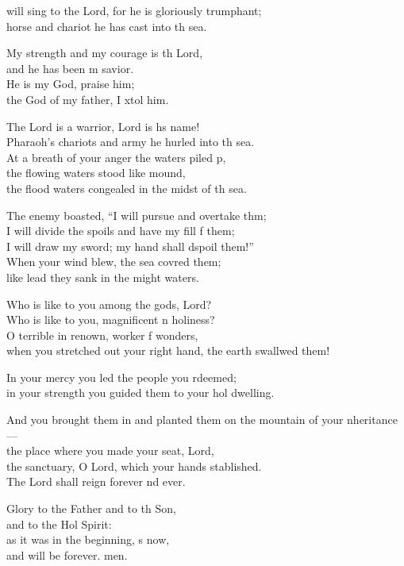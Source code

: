 \settowidth{\versewidth}{And you brought them in and planted them on the mountain of your inheritance— *}
\begin{psalmverse}%
  \begin{patverse}
     will sing to the Lord, for he is gloriously tr\pointup{\i}umphant;\Med\\
horse and chariot he has cast into th sea.

My strength and my courage is th Lord,\Med\\
and he has been m savior.\\
He is my God,  praise him;\Med\\
the God of my father, I xtol him.

The Lord is a warrior, Lord is h\pointup{\i}s name!\Med\\
Pharaoh’s chariots and army he hurled into th sea.\\
At a breath of your anger the waters piled p,\Flex\\
the flowing waters stood like  mound,\Med\\
the flood waters congealed in the midst of th sea.

The enemy boasted, “I will pursue and overtake thm;\Flex\\
I will divide the spoils and have my fill f them;\Med\\
I will draw my sword; my hand shall dspoil them!”\\
When your wind blew, the sea covred them;\Med\\
like lead they sank in the might waters.

Who is like to you among the gods,  Lord?\Med\\
Who is like to you, magnificent \pointup{\i}n holiness?\\
O terrible in renown, worker f wonders,\Med\\
when you stretched out your right hand, the earth swallwed them!

In your mercy you led the people you rdeemed;\Med\\
in your strength you guided them to your hol dwelling.

And you brought them in and planted them on the mountain of your \pointup{\i}nheritance—\Med\\
the place where you made your seat,  Lord,\\
the sanctuary, O Lord, which your hands stablished.\Med\\
The Lord shall reign forever nd ever.

Glory to the Father and to th Son,\Med\\
and to the Hol Spirit:\\
as it was in the beginning, \pointup{\i}s now,\Med\\
and will be forever. men. 
  \end{patverse}
\end{psalmverse}
